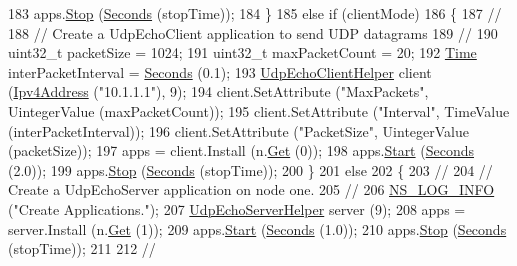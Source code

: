 \begin{DoxyCode}
183       apps.\hyperlink{classns3_1_1ApplicationContainer_adfc52f9aa4020c8714679b00bbb9ddb3}{Stop} (\hyperlink{group__timecivil_ga33c34b816f8ff6628e33d5c8e9713b9e}{Seconds} (stopTime));
184     \}
185   \textcolor{keywordflow}{else} \textcolor{keywordflow}{if} (clientMode)
186     \{
187       \textcolor{comment}{//}
188       \textcolor{comment}{// Create a UdpEchoClient application to send UDP datagrams }
189       \textcolor{comment}{//}
190       uint32\_t packetSize = 1024;
191       uint32\_t maxPacketCount = 20;
192       \hyperlink{classns3_1_1Time}{Time} interPacketInterval = \hyperlink{group__timecivil_ga33c34b816f8ff6628e33d5c8e9713b9e}{Seconds} (0.1);
193       \hyperlink{classns3_1_1UdpEchoClientHelper}{UdpEchoClientHelper} client (\hyperlink{classns3_1_1Ipv4Address}{Ipv4Address} (\textcolor{stringliteral}{"10.1.1.1"}), 9);
194       client.SetAttribute (\textcolor{stringliteral}{"MaxPackets"}, UintegerValue (maxPacketCount));
195       client.SetAttribute (\textcolor{stringliteral}{"Interval"}, TimeValue (interPacketInterval));
196       client.SetAttribute (\textcolor{stringliteral}{"PacketSize"}, UintegerValue (packetSize));
197       apps = client.Install (n.\hyperlink{classns3_1_1NodeContainer_a9ed96e2ecc22e0f5a3d4842eb9bf90bf}{Get} (0));
198       apps.\hyperlink{classns3_1_1ApplicationContainer_a8eff87926507020bbe3e1390358a54a7}{Start} (\hyperlink{group__timecivil_ga33c34b816f8ff6628e33d5c8e9713b9e}{Seconds} (2.0));
199       apps.\hyperlink{classns3_1_1ApplicationContainer_adfc52f9aa4020c8714679b00bbb9ddb3}{Stop} (\hyperlink{group__timecivil_ga33c34b816f8ff6628e33d5c8e9713b9e}{Seconds} (stopTime));
200     \}
201   \textcolor{keywordflow}{else}
202     \{
203       \textcolor{comment}{//}
204       \textcolor{comment}{// Create a UdpEchoServer application on node one.}
205       \textcolor{comment}{//}
206       \hyperlink{group__logging_gafbd73ee2cf9f26b319f49086d8e860fb}{NS\_LOG\_INFO} (\textcolor{stringliteral}{"Create Applications."});
207       \hyperlink{classns3_1_1UdpEchoServerHelper}{UdpEchoServerHelper} server (9);
208       apps = server.Install (n.\hyperlink{classns3_1_1NodeContainer_a9ed96e2ecc22e0f5a3d4842eb9bf90bf}{Get} (1));
209       apps.\hyperlink{classns3_1_1ApplicationContainer_a8eff87926507020bbe3e1390358a54a7}{Start} (\hyperlink{group__timecivil_ga33c34b816f8ff6628e33d5c8e9713b9e}{Seconds} (1.0));
210       apps.\hyperlink{classns3_1_1ApplicationContainer_adfc52f9aa4020c8714679b00bbb9ddb3}{Stop} (\hyperlink{group__timecivil_ga33c34b816f8ff6628e33d5c8e9713b9e}{Seconds} (stopTime));
211     
212       \textcolor{comment}{//}

\end{DoxyCode}
